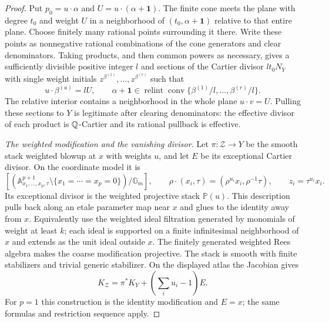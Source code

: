 \begin{proof}
Put $p_0=u\cdot\alpha$ and $U=u\cdot(\alpha+\mathbf1)$.
The finite cone meets the plane with degree $t_0$ and weight $U$ in
a neighborhood of $(t_0,\alpha+\mathbf1)$ relative to that entire
plane.  Choose finitely many rational points surrounding it there.
Write these points as nonnegative rational combinations of the cone
generators and clear denominators.  Taking products, and then common
powers as necessary, gives a sufficiently divisible positive integer
$l$ and sections of the Cartier divisor $lt_0N_Y$ with single weight
initials $z^{\beta^{(1)}},\ldots,z^{\beta^{(r)}}$ such that
\[
 u\cdot\beta^{(a)}=lU,\qquad
 \alpha+\mathbf1\in
 \operatorname{relint}\operatorname{conv}
       \{\beta^{(1)}/l,\ldots,\beta^{(r)}/l\}.
\]
The relative interior contains a neighborhood in the whole plane
$u\cdot v=U$.  Pulling these sections to $Y$ is legitimate after
clearing denominators: the effective divisor of each product is
$\mathbb Q$-Cartier and its rational pullback is effective.

\medskip
\noindent\emph{The weighted modification and the vanishing divisor.}
Let $\pi:\mathcal Z\to Y$ be the smooth stack weighted blowup at $x$
with weights $u$, and let $E$ be its exceptional Cartier divisor.
On the coordinate model it is
\[
 \left[(\mathbb A^{p+1}_{x_1,\ldots,x_p,\tau}
       \setminus\{x_1=\cdots=x_p=0\})/\mathbb G_m\right],
 \qquad
 \rho\cdot(x_i,\tau)=(\rho^{u_i}x_i,\rho^{-1}\tau),
 \qquad z_i=\tau^{u_i}x_i.
\]
Its exceptional divisor is the weighted projective stack $\mathbb P(u)$.
This description pulls back along an etale parameter map near $x$
and glues to the identity away from $x$.  Equivalently use the weighted
ideal filtration generated by monomials of weight at least $k$; each
ideal is supported on a finite infinitesimal neighborhood of $x$ and
extends as the unit ideal outside $x$.  The finitely generated weighted
Rees algebra makes the coarse modification projective.  The stack is
smooth with finite stabilizers and trivial generic stabilizer.  On the
displayed atlas the Jacobian gives
\[
 K_{\mathcal Z}=\pi^*K_Y+(\textstyle\sum_i u_i-1)E.
\]
For $p=1$ this construction is the identity modification and $E=x$;
the same formulas and restriction sequence apply.


\end{proof}
